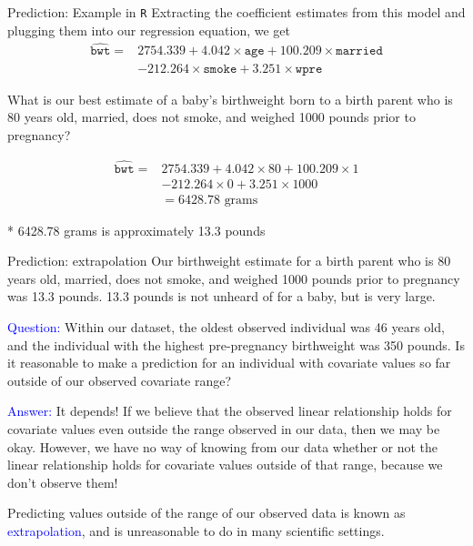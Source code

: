 \documentclass[10pt,t]{beamer}
\begin{document}
\begin{frame}{Prediction: Example in \texttt{R}}
Extracting the coefficient estimates from this model and plugging them into our regression equation, we get
\begin{align*}
	\widehat{\texttt{bwt}} = & 2754.339 + 4.042 \times \texttt{age} + 100.209 \times \texttt{married} \\
	& - 212.264 \times \texttt{smoke} + 3.251 \times \texttt{wpre} 
\end{align*}

What is our best estimate of a baby's birthweight born to a birth parent who is 80 years old, married, does not smoke, and weighed 1000 pounds prior to pregnancy? \pause

\begin{align*}
\widehat{\texttt{bwt}} = & 2754.339 + 4.042 \times 80 + 100.209 \times 1 \\
& - 212.264 \times 0 + 3.251 \times 1000  \\
& = 6428.78 \text{ grams}
\end{align*}

* 6428.78 grams is approximately 13.3 pounds

\end{frame}

\begin{frame}{Prediction: extrapolation}
	\vspace{-0.5cm}
Our birthweight estimate for a birth parent who is 80 years old, married, does not smoke, and weighed 1000 pounds prior to pregnancy was 13.3 pounds. 13.3 pounds is not unheard of for a baby, but is very large.

\vspace{0.3cm}

\textcolor{blue}{Question:} Within our dataset, the oldest observed individual was 46 years old, and the individual with the highest pre-pregnancy birthweight was 350 pounds. Is it reasonable to make a prediction for an individual with covariate values so far outside of our observed covariate range? \pause

\vspace{0.3cm}

\textcolor{blue}{Answer:} It depends! If we believe that the observed linear relationship holds for covariate values even outside the range observed in our data, then we may be okay. However, we have no way of knowing from our data whether or not the linear relationship holds for covariate values outside of that range, because we don't observe them! 

\vspace{0.3cm}

\small Predicting values outside of the range of our observed data is known as \textcolor{blue}{extrapolation}, and is unreasonable to do in many scientific settings.

\end{frame}
\end{document}
